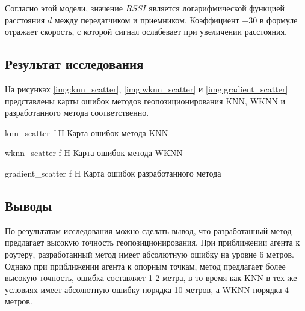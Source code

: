Согласно этой модели, значение $RSSI$ является логарифмической функцией расстояния $d$ между передатчиком и приемником. Коэффициент $-30$ в формуле отражает скорость, с которой сигнал ослабевает при увеличении расстояния.

\clearpage

\subsection{Результат исследования}

На рисунках \ref{img:knn_scatter}, \ref{img:wknn_scatter} и \ref{img:gradient_scatter} представлены карты ошибок методов геопозиционирования KNN, WKNN и разработанного метода соответственно.

    {knn_scatter}
    {f}
    {H}
    {\linewidth}
    {Карта ошибок метода KNN}

    {wknn_scatter}
    {f}
    {H}
    {\linewidth}
    {Карта ошибок метода WKNN}

    {gradient_scatter}
    {f}
    {H}
    {\linewidth}
    {Карта ошибок разработанного метода}

\subsection{Выводы}

По результатам исследования можно сделать вывод, что разработанный метод предлагает высокую точность геопозиционирования. При приближении агента к роутеру, разработанный метод имеет абсолютную ошибку на уровне 6 метров. Однако при приближении агента к опорным точкам, метод предлагает более высокую точность, ошибка составляет 1-2 метра, в то время как KNN в тех же условиях имеет абсолютную ошибку порядка 10 метров, а WKNN порядка 4 метров.
